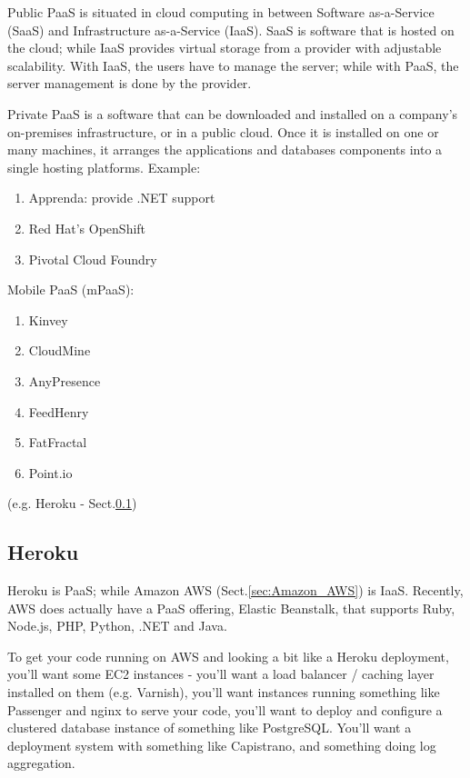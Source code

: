 Public PaaS is situated in cloud computing in between Software as-a-Service
(SaaS) and Infrastructure as-a-Service (IaaS). SaaS is software that is hosted
on the cloud; while IaaS provides virtual storage from a provider with
adjustable scalability. With IaaS, the users have to manage the server; while
with PaaS, the server management is done by the provider.

Private PaaS is a software that can be downloaded and installed on a company's
on-premises infrastructure, or in a public cloud. Once it is installed on one or
many machines, it arranges the applications and databases components into a
single hosting platforms. Example:
\begin{enumerate}
  \item Apprenda: provide .NET support
  \item Red Hat's OpenShift
  \item Pivotal Cloud Foundry
\end{enumerate}

Mobile PaaS (mPaaS):
\begin{enumerate}
  \item Kinvey
  \item CloudMine
  \item AnyPresence
  \item FeedHenry
  \item FatFractal
  \item Point.io
\end{enumerate}


 (e.g. Heroku -
Sect.\ref{sec:Heroku})


\subsection{Heroku}
\label{sec:Heroku}

Heroku is PaaS; while Amazon AWS (Sect.\ref{sec:Amazon_AWS}) is IaaS.
Recently, AWS does actually have a PaaS offering, Elastic Beanstalk, that
supports Ruby, Node.js, PHP, Python, .NET and Java.

To get your code running on AWS and looking a bit like a Heroku deployment,
you'll want some EC2 instances - you'll want a load balancer / caching layer
installed on them (e.g. Varnish), you'll want instances running something like
Passenger and nginx to serve your code, you'll want to deploy and configure a
clustered database instance of something like PostgreSQL. You'll want a
deployment system with something like Capistrano, and something doing log
aggregation.      

